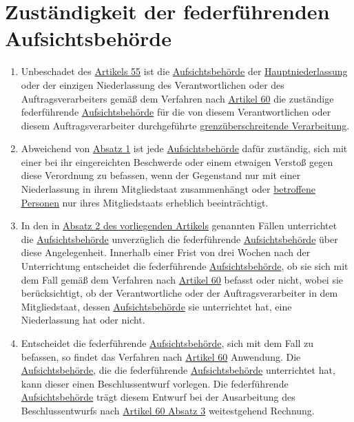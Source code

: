 \chapter{Zuständigkeit der federführenden Aufsichtsbehörde}
\label{ch:56}


\begin{enumerate}

  \item Unbeschadet des \hyperref[ch:55]{Artikels 55} ist die \hyperref[itm:04-21]{Aufsichtsbehörde} der \hyperref[itm:04-16]{Hauptniederlassung} oder der einzigen
   Niederlassung des Verantwortlichen oder des Auftragsverarbeiters gemäß dem Verfahren nach \hyperref[ch:60]
   {Artikel 60} die zuständige federführende \hyperref[itm:04-21]{Aufsichtsbehörde} für die von diesem Verantwortlichen oder diesem
   Auftragsverarbeiter durchgeführte \hyperref[itm:04-23]{grenzüberschreitende Verarbeitung}.
  \label{itm:56-1}

  \item Abweichend von \hyperref[itm:56-1]{Absatz 1} ist jede \hyperref[itm:04-21]{Aufsichtsbehörde} dafür zuständig, sich mit einer bei ihr
   eingereichten Beschwerde oder einem etwaigen Verstoß gegen diese Verordnung zu befassen, wenn der Gegenstand nur mit
   einer Niederlassung in ihrem Mitgliedstaat zusammenhängt oder \hyperref[itm:04-1]{betroffene Personen} nur ihres Mitgliedstaats erheblich
   beeinträchtigt.
  \label{itm:56-2}

  \item In den in \hyperref[itm:56-2]{Absatz 2 des vorliegenden Artikels} genannten Fällen unterrichtet die
   \hyperref[itm:04-21]{Aufsichtsbehörde} unverzüglich die federführende \hyperref[itm:04-21]{Aufsichtsbehörde} über diese Angelegenheit. Innerhalb einer Frist von
   drei Wochen nach der Unterrichtung entscheidet die federführende \hyperref[itm:04-21]{Aufsichtsbehörde}, ob sie sich mit dem Fall gemäß
   dem Verfahren nach \hyperref[ch:60]{Artikel 60} befasst oder nicht, wobei sie berücksichtigt, ob der Verantwortliche
   oder der Auftragsverarbeiter in dem Mitgliedstaat, dessen \hyperref[itm:04-21]{Aufsichtsbehörde} sie unterrichtet hat, eine Niederlassung
   hat oder nicht.
  \label{itm:56-3}

  \item Entscheidet die federführende \hyperref[itm:04-21]{Aufsichtsbehörde}, sich mit dem Fall zu befassen, so findet das Verfahren nach
   \hyperref[ch:60]{Artikel 60} Anwendung. Die \hyperref[itm:04-21]{Aufsichtsbehörde}, die die federführende \hyperref[itm:04-21]{Aufsichtsbehörde} unterrichtet
    hat, kann dieser einen Beschlussentwurf vorlegen. Die federführende \hyperref[itm:04-21]{Aufsichtsbehörde} trägt diesem Entwurf bei der
    Ausarbeitung des Beschlussentwurfs nach \hyperref[itm:60-3]{Artikel 60 Absatz 3} weitestgehend Rechnung.
  \label{itm:56-4}


\end{enumerate}
